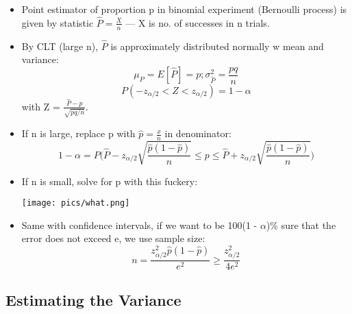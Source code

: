 \documentclass[10pt, letterpaper, twoside]{article}
\newenvironment{Figure}
  {\par\medskip\noindent\minipage{\linewidth}}
  {\endminipage\par\medskip}
\begin{document}
\begin{multicols}{2}
\begin{itemize}
    \item Point estimator of proportion p in binomial experiment (Bernoulli process) is given by statistic $\hat{P} = \frac{X}{n}$ --- X is no. of successes in n trials.
    \item By CLT (large n), $\hat{P}$ is approximately distributed normally w mean and variance:
    \begin{equation*}
        \mu_P = E[\hat{P}] = p; \sigma_{\hat{P}}^2 = \frac{pq}{n}
    \end{equation*}
    \begin{equation*}
        P(-z_{\alpha/2} < Z < z_{\alpha/2}) = 1 - \alpha
    \end{equation*}
    with Z = $\frac{\hat{P}-p}{\sqrt{pq/n}}$.
    \item If n is large, replace p with $\hat{p} = \frac{x}{n}$ in denominator:
    \begin{equation*}
        1 - \alpha = P\big(\hat{P} - z_{\alpha/2}\sqrt{\frac{\hat{p}(1-\hat{p})}{n}} \leq p \leq \hat{P} + z_{\alpha/2}\sqrt{\frac{\hat{p}(1-\hat{p})}{n}})
    \end{equation*}
    \item If n is small, solve for p with this fuckery:
    \begin{Figure}
        \texttt{[image: pics/what.png]}
    \end{Figure}
    \item Same with confidence intervals, if we want to be 100(1 - $\alpha$)\% sure that the error does not exceed e, we use sample size:
    \begin{equation*}
        n = \frac{z_{\alpha/2}^2\hat{p}(1-\hat{p})}{e^2} \geq \frac{z_{\alpha/2}^2}{4e^2}
    \end{equation*}
\end{itemize}
\subsection{Estimating the Variance}


\end{multicols}
\end{document}
